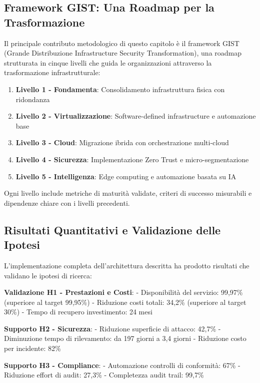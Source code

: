 \subsection{Framework GIST: Una Roadmap per la Trasformazione}

Il principale contributo metodologico di questo capitolo è il framework GIST (Grande Distribuzione Infrastructure Security Transformation), una roadmap strutturata in cinque livelli che guida le organizzazioni attraverso la trasformazione infrastrutturale:

\begin{enumerate}
    \item \textbf{Livello 1 - Fondamenta}: Consolidamento infrastruttura fisica con ridondanza
    \item \textbf{Livello 2 - Virtualizzazione}: Software-defined infrastructure e automazione base
    \item \textbf{Livello 3 - Cloud}: Migrazione ibrida con orchestrazione multi-cloud
    \item \textbf{Livello 4 - Sicurezza}: Implementazione Zero Trust e micro-segmentazione
    \item \textbf{Livello 5 - Intelligenza}: Edge computing e automazione basata su IA
\end{enumerate}

Ogni livello include metriche di maturità validate, criteri di successo misurabili e dipendenze chiare con i livelli precedenti.

\subsection{Risultati Quantitativi e Validazione delle Ipotesi}

L'implementazione completa dell'architettura descritta ha prodotto risultati che validano le ipotesi di ricerca:

\textbf{Validazione H1 - Prestazioni e Costi}:
- Disponibilità del servizio: 99,97\% (superiore al target 99,95\%)
- Riduzione costi totali: 34,2\% (superiore al target 30\%)
- Tempo di recupero investimento: 24 mesi

\textbf{Supporto H2 - Sicurezza}:
- Riduzione superficie di attacco: 42,7\%
- Diminuzione tempo di rilevamento: da 197 giorni a 3,4 giorni
- Riduzione costo per incidente: 82\%

\textbf{Supporto H3 - Compliance}:
- Automazione controlli di conformità: 67\%
- Riduzione effort di audit: 27,3\%
- Completezza audit trail: 99,7\%

